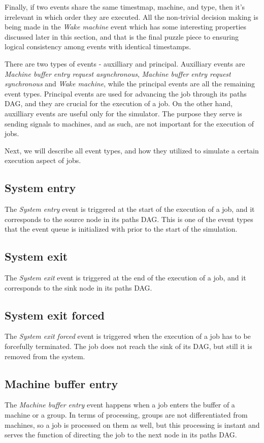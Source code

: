 Finally, if two events share the same timestmap, machine, and type, then it's irrelevant in which order they are executed. All the non-trivial decision making is being made in the \textit{Wake machine} event which has some interesting properties discussed later in this section, and that is the final puzzle piece to ensuring logical consistency among events with identical timestamps.

There are two types of events - auxilliary and principal. Auxilliary events are \textit{Machine buffer entry request asynchronous}, \textit{Machine buffer entry request synchronous} and \textit{Wake machine}, while the principal events are all the remaining event types. Principal events are used for advancing the job through its paths DAG, and they are crucial for the execution of a job. On the other hand, auxilliary events are useful only for the simulator. The purpose they serve is sending signals to machines, and as such, are not important for the execution of jobs.

Next, we will describe all event types, and how they utilized to simulate a certain execution aspect of jobs.

\subsection{System entry}
The \textit{System entry} event is triggered at the start of the execution of a job, and it corresponds to the source node in its paths DAG. This is one of the event types that the event queue is initialized with prior to the start of the simulation.

\subsection{System exit}
The \textit{System exit} event is triggered at the end of the execution of a job, and it corresponds to the sink node in its paths DAG.

\subsection{System exit forced}
The \textit{System exit forced} event is triggered when the execution of a job has to be forcefully terminated. The job does not reach the sink of its DAG, but still it is removed from the system.

\subsection{Machine buffer entry}
The \textit{Machine buffer entry} event happens when a job enters the buffer of a machine or a group. In terms of processing, groups are not differentiated from machines, so a job is processed on them as well, but this processing is instant and serves the function of directing the job to the next node in its paths DAG.

